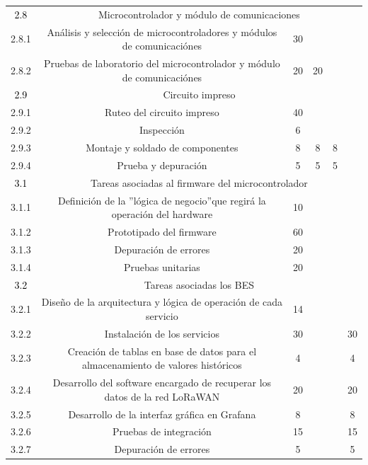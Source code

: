 \documentclass[11pt]{charter}
\begin{document}
\begin{table}[H]
{\begin{tabular}{|c|c|c|c|c|c|}
			
			\rowcolor[HTML]{D48B1E} 
			\textcolor{black}{2.8}& \multicolumn{5}{|c|}{Microcontrolador y módulo de comunicaciones} \\ \cline{1-6}		
			2.8.1 & Análisis y selección de microcontroladores y módulos de comunicaciónes & 30 &  &  &  \\ \hline   
			2.8.2 & Pruebas de laboratorio del microcontrolador y módulo de comunicaciónes & 20 & 20 &  &  \\ \hline
	
			
			\rowcolor[HTML]{B34791} 
			\textcolor{black}{2.9}& \multicolumn{5}{|c|}{Circuito impreso} \\ \cline{1-6}		   
			2.9.1 & Ruteo del circuito impreso & 40 &  &  &  \\ \hline   
			2.9.2 & Inspección & 6 &  &  &  \\ \hline    
			2.9.3 & Montaje y soldado de componentes & 8 & 8 & 8 &  \\ \hline
			2.9.4 & Prueba y depuración & 5 & 5 & 5 &  \\ \hline		
	
			
			\rowcolor[HTML]{0A12FC} 
			\textcolor{black}{3.1} & \multicolumn{5}{|c|}{Tareas asociadas al firmware del microcontrolador} \\ \cline{1-6}		   
			3.1.1 & Definición de la ”lógica de negocio”que regirá la operación del hardware & 10 &  &  &  \\ \hline   
			3.1.2  & Prototipado del firmware & 60 &  &  &  \\ \hline   
			3.1.3  & Depuración de errores & 20 &  &  &  \\ \hline
			3.1.4  & Pruebas unitarias & 20 &  &  &  \\ \hline
	
		
			\rowcolor[HTML]{95FF00} 
			\textcolor{black}{3.2} & \multicolumn{5}{|c|}{Tareas asociadas los BES} \\ \cline{1-6}		   
			3.2.1  & Diseño de la arquitectura y lógica de operación de cada servicio & 14 &  &  &  \\ \hline   
			3.2.2  & Instalación de los servicios & 30 &  &  & 30 \\ \hline   
			3.2.3  & Creación de tablas en base de datos para el almacenamiento de valores históricos & 4 &  &  & 4 \\ \hline   
			3.2.4  & Desarrollo del software encargado de recuperar los datos de la red LoRaWAN & 20 &  &  & 20 \\ \hline
			3.2.5  & Desarrollo de la interfaz gráfica en Grafana & 8 &  &  & 8 \\ \hline   
			3.2.6  & Pruebas de integración & 15 &  &  & 15 \\ \hline
			3.2.7  & Depuración de errores & 5 &  &  & 5 \\ \hline
			

\end{tabular}}
\end{table}
\end{document}
